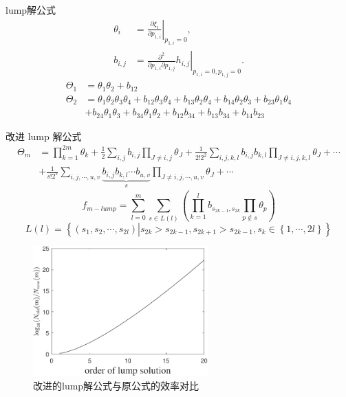 \documentclass[handout]{beamer}
\newcommand{\sbrace}[1]{\left(#1\right)}
\newcommand{\bbrace}[1]{\left\{#1\right\}}
\newcommand{\eval}[2]{\left.{#1}\right|_{#2}}
\begin{document}
\begin{frame}{lump解公式}
\begin{equation}
\begin{aligned}
\theta_i &= \eval{\frac{\partial \xi_i}{\partial p_{1,i}}}{p_{1,i}=0}, \\
b_{i,j}&= \eval{\frac{\partial^2}{\partial p_{1,i}\partial p_{1,j}}h_{i,j}}{p_{1,i}=0,p_{1,j}=0}.
\end{aligned}
\end{equation}
\begin{equation}
\begin{aligned}
\Theta_1&=\theta_{1}\theta_{2}+b_{12} \\
\Theta_2&=\theta_{1}\theta_{2}\theta_{3}\theta_{4}+b_{12}\theta_{3}\theta_{4}+b_{13}\theta_{2}\theta_{4}+b_{14}\theta_{2}\theta_{3}+b_{23}\theta_{1}\theta_{4}\\
&+b_{24}\theta_{1}\theta_{3}+b_{34}\theta_{1}\theta_{2}+b_{12}b_{34}+b_{13}b_{34}+b_{14}b_{23}
\end{aligned}
\end{equation}
\end{frame}

\begin{frame}{改进 lump 解公式}
\begin{equation}
\begin{aligned}
\Theta_m&=\prod_{k=1}^{2m}\theta_k+\frac{1}{2}\sum_{i,j}{b_{i,j}}\prod_{J\neq i,j}{\theta_J}+\frac{1}{2! 2^2}\sum_{i,j,k,l}{b_{i,j}b_{k,l}}\prod_{J\neq i,j,k,l}{\theta_{J}}+\cdots \\
&+\frac{1}{s!2^s}\sum_{i,j,\cdots,u,v}\underbrace{{b_{i,j}b_{k,l}\cdots b_{u,v}}}_{s}\prod_{J\neq i,j,\cdots, u,v}{\theta_J}+\cdots 
\end{aligned}
\end{equation}
\pause 
\vfill
\begin{equation}
f_{m-lump}=\sum_{l=0}^m\sum_{s\in L(l)}\sbrace{\prod_{k=1}^l{b_{s_{2k-1},s_{2k}}}\prod_{p\not\in s}{\theta_p}}
\end{equation}
\begin{equation*}
  L(l)=\bbrace{\sbrace{s_1, s_2, \cdots ,s_{2l}}\left|s_{2k}>s_{2k-1},s_{2k+1}>s_{2k-1},s_k\in \bbrace{1,\cdots,2l}\right.}
\end{equation*}
\end{frame}

\begin{frame}
\begin{figure}
\centering 
\includegraphics[width=0.6\textwidth]{../paper/fig/lump_cmp.pdf}
\caption{改进的lump解公式与原公式的效率对比}\label{lump_cmp}
\end{figure}
\end{frame}
\end{document}
